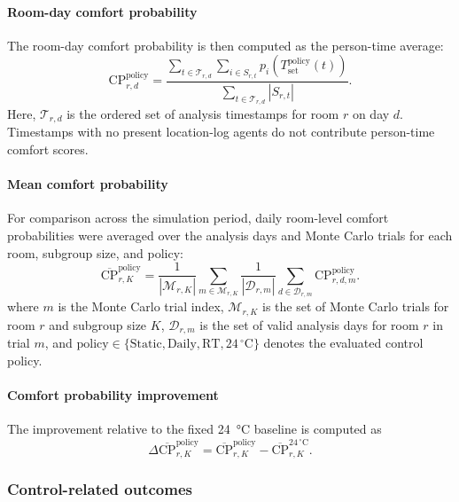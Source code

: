 \paragraph{Room-day comfort probability}
The room-day comfort probability is then computed as the person-time average:
\begin{equation}
\mathrm{CP}_{r,d}^{\mathrm{policy}}
=
\frac{
\sum_{t\in\mathcal{T}_{r,d}}
\sum_{i\in S_{r,t}}
p_i\!\left(T_{\mathrm{set}}^{\mathrm{policy}}(t)\right)
}{
\sum_{t\in\mathcal{T}_{r,d}}
|S_{r,t}|
}.
\label{eq:comfort_probability_daily}
\end{equation}
Here, $\mathcal{T}_{r,d}$ is the ordered set of analysis timestamps for room $r$ on day $d$.
Timestamps with no present location-log agents do not contribute person-time comfort scores.

\paragraph{Mean comfort probability}
For comparison across the simulation period, daily room-level comfort probabilities were averaged over the analysis days and Monte Carlo trials for each room, subgroup size, and policy:
\begin{equation}
\overline{\mathrm{CP}}_{r,K}^{\mathrm{policy}}
=
\frac{1}{|\mathcal{M}_{r,K}|}
\sum_{m\in\mathcal{M}_{r,K}}
\frac{1}{|\mathcal{D}_{r,m}|}
\sum_{d\in\mathcal{D}_{r,m}}
\mathrm{CP}_{r,d,m}^{\mathrm{policy}} .
\end{equation}
where $m$ is the Monte Carlo trial index, $\mathcal{M}_{r,K}$ is the set of Monte Carlo trials for room $r$ and subgroup size $K$, $\mathcal{D}_{r,m}$ is the set of valid analysis days for room $r$ in trial $m$, and $\mathrm{policy}\in\{\mathrm{Static},\mathrm{Daily},\mathrm{RT},24\,^\circ\mathrm{C}\}$ denotes the evaluated control policy.

\paragraph{Comfort probability improvement}
The improvement relative to the fixed \qty{24}{\celsius} baseline is computed as
\begin{equation}
\Delta \overline{\mathrm{CP}}_{r,K}^{\mathrm{policy}}
=
\overline{\mathrm{CP}}_{r,K}^{\mathrm{policy}}
-
\overline{\mathrm{CP}}_{r,K}^{24\,^\circ\mathrm{C}} .
\label{eq:comfort_probability_improvement}
\end{equation}

\subsubsection{Control-related outcomes}

